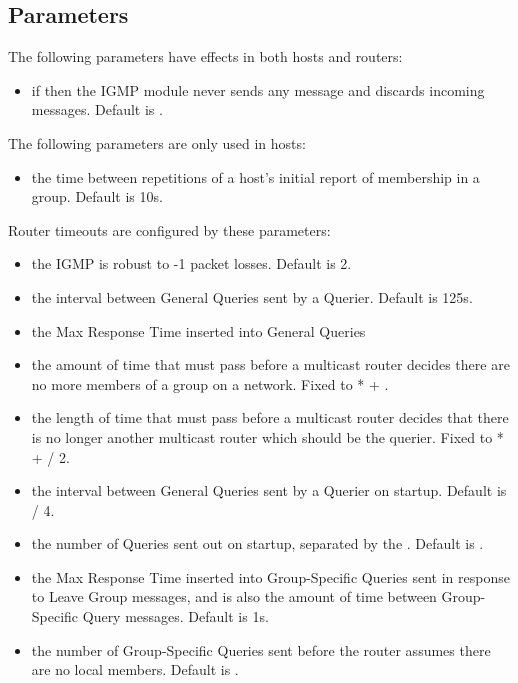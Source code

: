 
\subsection*{Parameters}

The following parameters have effects in both hosts and routers:

\begin{itemize}
  \item {} if  then the IGMP module
     never sends any message and discards incoming messages.
  Default is .
\end{itemize}

The following parameters are only used in hosts:

\begin{itemize}
  \item {} the time between repetitions of a
   host's initial report of membership in a group. Default is 10s.
\end{itemize}

Router timeouts are configured by these parameters:

\begin{itemize}
  \item {} the IGMP is robust to -1
   packet losses. Default is 2.
  \item {} the interval between General Queries sent by a Querier.
   Default is 125s.
  \item {} the Max Response Time inserted into General Queries
  \item {} the amount of time that must pass before
   a multicast router decides there are no more members of a group on a network.
   Fixed to  *  + .
  \item {} the length of time that must
   pass before a multicast router decides that there is no longer
   another multicast router which should be the querier.
   Fixed to  *  +  / 2.
  \item {} the interval between General Queries
   sent by a Querier on startup. Default is  / 4.
  \item {} the number of Queries sent out on startup,
   separated by the . Default is .
  \item {} the Max Response Time inserted into
   Group-Specific Queries sent in response to Leave Group messages, and
   is also the amount of time between Group-Specific Query messages.
   Default is 1s.
  \item {} the number of Group-Specific Queries
   sent before the router assumes there are no local members.
   Default is .
\end{itemize}



